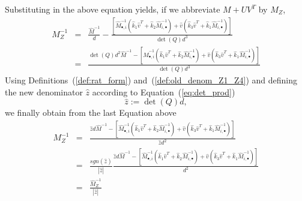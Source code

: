 \documentclass[a4paper]{article}
\begin{document}
Substituting in the above equation yields,
if we abbreviate $M+UV^{T}$ by $M_{Z}$,
\begin{eqnarray}
M_{Z}^{-1}&=&\frac{\hat{M}^{-1}}{d}
-
\frac{
\left[
  \hat{M}^{-1}_{\bullet, i}
  \left(\hat{k}_{1}\hat{v}^{T} + \hat{k}_{2}\hat{M}^{-1}_{i, \bullet}\right)
  +\hat{v}\left(\hat{k}_{3}\hat{v}^{T}
  +\hat{k}_{1}\hat{M}^{-1}_{i, \bullet}\right)
\right]
}{\det(Q)d^{3}}
\nonumber \\
&=&
\frac{
\det(Q)d^{2}\hat{M}^{-1}
-
\left[
  \hat{M}^{-1}_{\bullet, i}
  \left(\hat{k}_{1}\hat{v}^{T} + \hat{k}_{2}\hat{M}^{-1}_{i, \bullet}\right)
  +\hat{v}\left(\hat{k}_{3}\hat{v}^{T}
  +\hat{k}_{1}\hat{M}^{-1}_{i, \bullet}\right)
\right]
}{\det(Q)d^{3}}
\nonumber
\end{eqnarray}
Using Definitions~(\ref{def:rat_form})
and~(\ref{def:old_denom_Z1_Z4}) and defining the new denominator $\hat{z}$
according to Equation~(\ref{eq:det_prod})
\begin{equation}
\label{def:new_denom_Z1_Z4}
\hat{z}:=\det(Q)d,
\end{equation}
we finally obtain from the last Equation above
\begin{eqnarray}
\label{def:update_Z1_Z4_denom}
M_{Z}^{-1}
&=&
\frac{\hat{z}d\hat{M}^{-1}
- 
\left[
  \hat{M}^{-1}_{\bullet, i}
  \left(\hat{k}_{1}\hat{v}^{T} + \hat{k}_{2}\hat{M}^{-1}_{i, \bullet}\right)
  +\hat{v}\left(\hat{k}_{3}\hat{v}^{T}
  +\hat{k}_{1}\hat{M}^{-1}_{i, \bullet}\right)
\right]}
{\hat{z}d^{2}}
\nonumber \\
&=&
\frac{sgn(\hat{z})}{\left|\hat{z}\right|}
\frac{\hat{z}d\hat{M}^{-1}
- 
\left[
  \hat{M}^{-1}_{\bullet, i}
  \left(\hat{k}_{1}\hat{v}^{T} + \hat{k}_{2}\hat{M}^{-1}_{i, \bullet}\right)
  +\hat{v}\left(\hat{k}_{3}\hat{v}^{T}
  +\hat{k}_{1}\hat{M}^{-1}_{i, \bullet}\right)
\right]}
{d^{2}}
\nonumber \\
&=&
\frac{\hat{M}_{Z}^{-1}}{\left|\hat{z}\right|}
\end{eqnarray}

  
\end{document}

